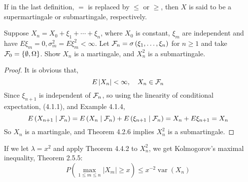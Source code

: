 \begin{remark}
	If in the last definition, $=$ is replaced by $\leq$ or $\geq$, then $X$ is said to be a supermartingale or submartingale, respectively.
\end{remark}

\begin{example}

\end{example}

\begin{example}

\end{example}

\begin{example}

\end{example}

\begin{example}
	Suppose $X_{n}=X_{0}+\xi_{1}+\cdots+\xi_{n}$, where $X_{0}$ is constant, $\xi_{m}$ are independent and have $E\xi_{m}=0,\sigma_{m}^{2}=E\xi_{m}^{2}<\infty$. Let ${\mathcal F}_{n}=\sigma\left(\xi_{1},\ldots,\xi_{n}\right)$ for $n\geq 1$ and take ${\mathcal F}_{0}=\{\emptyset, \Omega\}$. Show $X_{n}$ is a martingale, and $X_{n}^{2}$ is a submartingale.
\end{example}

\begin{proof}
	It is obvious that,
	\begin{equation*}
		E\left|X_{n}\right|<\infty,\quad X_{n}\in{\mathcal F}_{n}
	\end{equation*}
	Since $\xi_{n+1}$ is independent of ${\mathcal F}_{n}$, so using the linearity of conditional expectation, (4.1.1), and Example 4.1.4,
	\begin{equation*}
		E\left(X_{n+1}\mid{\mathcal F}_{n}\right)=E\left(X_{n}\mid{\mathcal F}_{n}\right)+E\left(\xi_{n+1}\mid{\mathcal F}_{n}\right)=X_{n}+E\xi_{n+1}=X_{n}
	\end{equation*}
	So $X_{n}$ is a martingale, and Theorem 4.2.6 implies $X_{n}^{2}$ is a submartingale.
\end{proof}

\begin{remark}
	If we let $\lambda=x^{2}$ and apply Theorem 4.4.2 to $X_{n}^{2}$, we get Kolmogorov's maximal inequality, Theorem 2.5.5:
	\begin{equation}
		P\left(\max_{1\leq m\leq n}\left|X_{m}\right|\geq x\right)\leq x^{-2}\operatorname{var}\left(X_{n}\right)
	\end{equation}
\end{remark}

